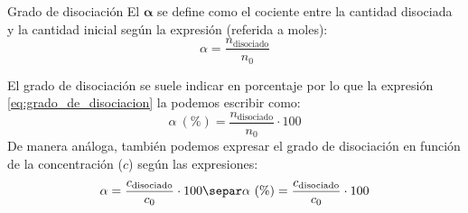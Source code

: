     \begin{center}
        \begin{definicion}[width=0.9\textwidth]{Grado de disociación}
            El  \(\bm{\alpha}\) se define como el cociente entre la cantidad disociada y la cantidad inicial según la expresión (referida a moles):
            \begin{equation}
                \alpha = \dfrac{n_{\text{disociado}}}{n_0} \label{eq:grado_de_disociacion}
            \end{equation}
        \end{definicion}
    \end{center}

    El grado de disociación se suele indicar en porcentaje por lo que la expresión \eqref{eq:grado_de_disociacion} la podemos escribir como:
    \begin{equation*}
        \alpha\ (\%)= \dfrac{n_{\text{disociado}}}{n_0}\cdot 100 \label{eq:grado_de_disociacion_porcentaje}
    \end{equation*}
    De manera análoga, también podemos expresar el grado de disociación en función de la concentración (\(c\)) según las expresiones:
    \begin{gather}
        \alpha= \dfrac{c_{\text{disociado}}}{c_0}\cdot 100 \label{eq:grado_de_disociacion_concentracion}\separ
        \alpha\ (\%) = \dfrac{c_{\text{disociado}}}{c_0}\cdot 100 \label{eq:grado_de_disociacion__concentracion_porcentaje}
    \end{gather}

